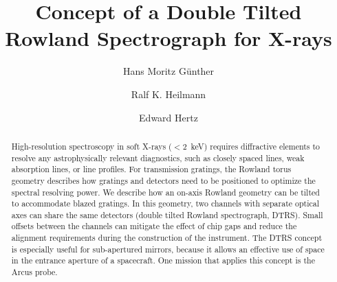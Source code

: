 \documentclass[linenumbers]{aastex631}
\begin{document}
\title{Concept of a Double Tilted Rowland Spectrograph for X-rays}





\author[0000-0003-4243-2840]{Hans Moritz G{\"u}nther}
\author[0000-0001-9980-5295]{Ralf K. Heilmann}
\author[0000-0002-6747-9648]{Edward Hertz}


\begin{abstract}
High-resolution spectroscopy in soft X-rays ($<2$~keV) requires diffractive elements to resolve any astrophysically relevant diagnostics, such as closely spaced lines, weak absorption lines, or line profiles. For transmission gratings, the Rowland torus geometry describes how gratings and detectors need to be positioned to optimize the spectral resolving power. We describe how an on-axis Rowland geometry can be tilted to accommodate blazed gratings. In this geometry, two channels with separate optical axes can share the same detectors (double tilted Rowland spectrograph, DTRS). Small offsets between the channels can mitigate the effect of chip gaps and reduce the alignment requirements during the construction of the instrument. The DTRS concept is especially useful for sub-apertured mirrors, because it allows an effective use of space in the entrance aperture of a spacecraft.
One mission that applies this concept is the Arcus probe.

\end{abstract}
\end{document}
